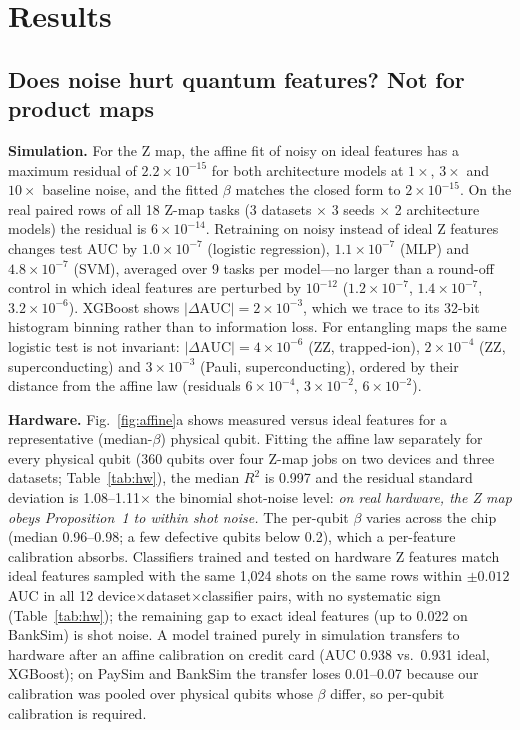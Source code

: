 \documentclass[conference,compsoc]{IEEEtran}
\begin{document}
\section{Results}
\subsection{Does noise hurt quantum features? Not for product maps}
\textbf{Simulation.} For the Z map, the affine fit of noisy on ideal features has a maximum residual of $2.2\times10^{-15}$ for both architecture models at $1\times$, $3\times$ and $10\times$ baseline noise, and the fitted $\beta$ matches the closed form to $2\times10^{-15}$. On the real paired rows of all 18 Z-map tasks (3 datasets $\times$ 3 seeds $\times$ 2 architecture models) the residual is $6\times10^{-14}$. Retraining on noisy instead of ideal Z features changes test AUC by $1.0\times10^{-7}$ (logistic regression), $1.1\times10^{-7}$ (MLP) and $4.8\times10^{-7}$ (SVM), averaged over 9 tasks per model---no larger than a round-off control in which ideal features are perturbed by $10^{-12}$ ($1.2\times10^{-7}$, $1.4\times10^{-7}$, $3.2\times10^{-6}$). XGBoost shows $|\Delta\mathrm{AUC}|=2\times10^{-3}$, which we trace to its 32-bit histogram binning rather than to information loss. For entangling maps the same logistic test is not invariant: $|\Delta\mathrm{AUC}|=4\times10^{-6}$ (ZZ, trapped-ion), $2\times10^{-4}$ (ZZ, superconducting) and $3\times10^{-3}$ (Pauli, superconducting), ordered by their distance from the affine law (residuals $6\times10^{-4}$, $3\times10^{-2}$, $6\times10^{-2}$).

\textbf{Hardware.} Fig.~\ref{fig:affine}a shows measured versus ideal features for a representative (median-$\beta$) physical qubit. Fitting the affine law separately for every physical qubit (360 qubits over four Z-map jobs on two devices and three datasets; Table~\ref{tab:hw}), the median $R^2$ is 0.997 and the residual standard deviation is 1.08--1.11$\times$ the binomial shot-noise level: \emph{on real hardware, the Z map obeys Proposition~1 to within shot noise.} The per-qubit $\beta$ varies across the chip (median 0.96--0.98; a few defective qubits below 0.2), which a per-feature calibration absorbs. Classifiers trained and tested on hardware Z features match ideal features sampled with the same 1,024 shots on the same rows within $\pm0.012$ AUC in all 12 device$\times$dataset$\times$classifier pairs, with no systematic sign (Table~\ref{tab:hw}); the remaining gap to exact ideal features (up to 0.022 on BankSim) is shot noise. A model trained purely in simulation transfers to hardware after an affine calibration on credit card (AUC 0.938 vs.\ 0.931 ideal, XGBoost); on PaySim and BankSim the transfer loses 0.01--0.07 because our calibration was pooled over physical qubits whose $\beta$ differ, so per-qubit calibration is required.
\end{document}
